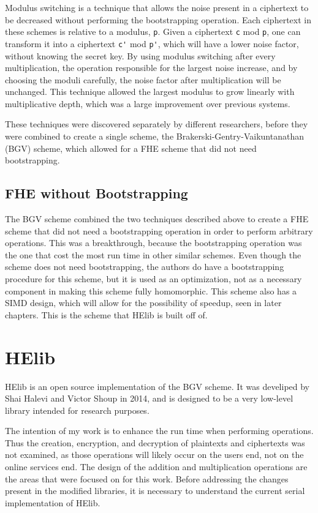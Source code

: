 Modulus switching \cite{coron2012public} is a technique that allows the noise present in a ciphertext to be decreased without performing the bootstrapping operation. Each ciphertext in these schemes is relative to a modulus, \verb|p|. Given a ciphertext \verb|c| mod \verb|p|, one can transform it into a ciphertext \verb|c'| mod \verb|p'|, which will have a lower noise factor, without knowing the secret key. By using modulus switching after every multiplication, the operation responsible for the largest noise increase, and by choosing the moduli carefully, the noise factor after multiplication will be unchanged. This technique allowed the largest modulus to grow linearly with multiplicative depth, which was a large improvement over previous systems.

These techniques were discovered separately by different researchers, before they were combined to create a single scheme, the Brakerski-Gentry-Vaikuntanathan (BGV) scheme, which allowed for a FHE scheme that did not need bootstrapping.

\subsection{FHE without Bootstrapping}
The BGV scheme \cite{cryptoeprint:2011:277} combined the two techniques described above to create a FHE scheme that did not need a bootstrapping operation in order to perform arbitrary operations. This was a breakthrough, because the bootstrapping operation was the one that cost the most run time in other similar schemes. Even though the scheme does not need bootstrapping, the authors do have a bootstrapping procedure for this scheme, but it is used as an optimization, not as a necessary component in making this scheme fully homomorphic. This scheme also has a SIMD design, which will allow for the possibility of speedup, seen in later chapters. This is the scheme that HElib is built off of.

\section{HElib}
HElib \cite{cryptoeprint:2014:106, cryptoeprint:2014:873, halevi2013design} is an open source implementation of the BGV scheme. It was develiped by Shai Halevi and Victor Shoup in 2014, and is designed to be a very low-level library intended for research purposes. 

The intention of my work is to enhance the run time when performing operations. Thus the creation, encryption, and decryption of plaintexts and ciphertexts was not examined, as those operations will likely occur on the users end, not on the online services end. The design of the addition and multiplication operations are the areas that were focused on for this work. Before addressing the changes present in the modified libraries, it is necessary to understand the current serial implementation of HElib. 

